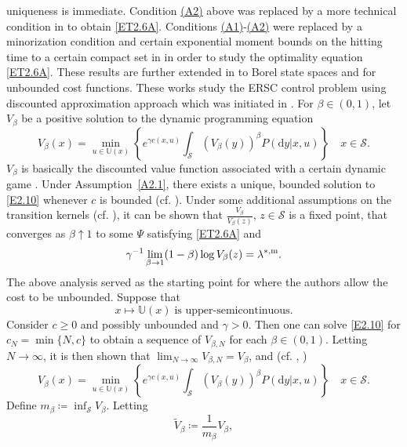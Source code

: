 \documentclass[notitlepage,11pt,reqno]{amsart}
\numberwithin{equation}{section}
\theoremstyle{plain}
\theoremstyle{definition}
\theoremstyle{remark}
\newcommand{\Act}{{\mathds{U}}}
\newcommand{\cS}{{\mathcal{S}}}     %
\newcommand{\lamstrdm}{\lambda^{*,{\rm m}}}
\newcommand{\D}{\mathrm{d}} %
\newcommand{\df}{\coloneqq}
\begin{document}
uniqueness is immediate.
Condition \hyperlink{A2}{(A2)} above was replaced by a more technical condition in \cite{DiMasi-99b} to obtain \eqref{ET2.6A}. Conditions \hyperlink{A1}{(A1)}-\hyperlink{A2}{(A2)} were
replaced by a minorization
condition and certain exponential moment bounds on the hitting time
to a certain compact set in \cite{DiMasi-07} in order to study the optimality
equation \eqref{ET2.6A}.
These results are further extended in \cite{Jaskiewicz-07,MR2585141,Jaskiewicz-07b} to Borel state spaces and for unbounded cost functions. These works study the ERSC control problem using discounted approximation approach which was initiated in \cite{DiMasi-99b}. For $\beta\in(0, 1)$, let $V_\beta$ be a
positive solution to the dynamic programming equation
\begin{equation}\label{E2.10}
V_\beta(x)=\min_{u\in\Act(x)}\left\{e^{\gamma c(x, u)}\int_{\cS} (V_\beta(y))^\beta P(\D{y}|x, u)\right\}\quad x\in\cS.
\end{equation}
$V_\beta$ is basically the discounted value function associated with a
certain dynamic game \cite[Lemma~1]{Jaskiewicz-07}. Under Assumption~\ref{A2.1}, there exists a unique, bounded solution to \eqref{E2.10} whenever $c$ is bounded (cf. \cite[Proposition~4.1]{DiMasi-99b}).
 Under some additional assumptions on 
the transition kernels (cf. \cite[Theorem~4.2]{DiMasi-99b}),
it can be shown that $\frac{V_\beta}{V_\beta(z)}$, $z\in\cS$ is a fixed point, that converges as $\beta\uparrow 1$ to some $\Psi$ satisfying \eqref{ET2.6A} and
$$\gamma^{-1}\lim_{\beta\to 1}(1-\beta)\log V_\beta(z)=\lamstrdm.$$
The above analysis served as the starting point for \cite{Jaskiewicz-07,MR2585141} where the authors allow the cost to be unbounded.
Suppose that
\begin{equation}\label{E2.11}
x\mapsto \Act(x) \; \text{is upper-semicontinuous.}
\end{equation}
Consider $c\geq 0$ and possibly unbounded and $\gamma>0$. 
Then one can solve \eqref{E2.10} for $c_N=\min\{N, c\}$ to obtain
a sequence of $V_{\beta, N}$ for each $\beta\in (0,1)$. Letting $N\to\infty$,
it is then shown that $\lim_{N\to\infty} V_{\beta, N}=V_\beta$, and
(cf. \cite[Lemma~3.1]{MR2585141}, \cite[Lemma~2]{Jaskiewicz-07})
\begin{equation}\label{E2.12}
V_\beta(x)=\min_{u\in\Act(x)}\left\{e^{\gamma c(x, u)}\int_{\cS} (V_\beta(y))^\beta P(\D{y}|x, u)\right\}\quad x\in\cS.
\end{equation}
Define $m_\beta\df \inf_{\cS} V_\beta$. Letting 
$$\tilde{V}_\beta\df \frac{1}{m_\beta} V_\beta,$$
\end{document}
